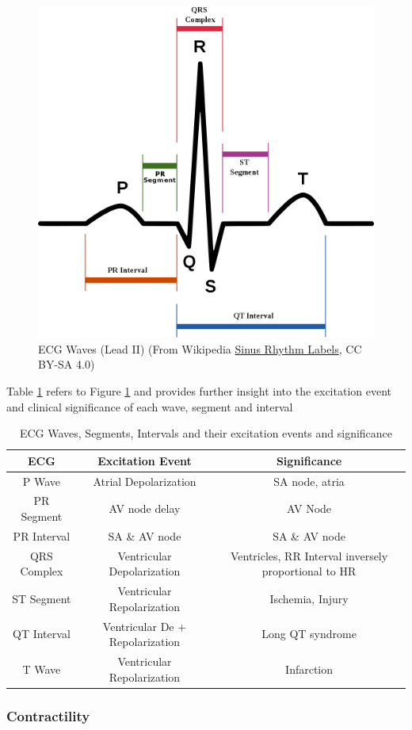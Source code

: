 \begin{figure}[!h]
    \centering
    \includegraphics[width=0.5\linewidth]{./figure/ECG.png}
    \caption{ECG Waves (Lead II) \footnotesize{(From Wikipedia  \href{https://commons.wikimedia.org/wiki/File:SinusRhythmLabels.svg}{Sinus Rhythm Labels}, CC BY-SA 4.0)}}
    \label{fig:ECG}
\end{figure}

Table \ref{ECGWaves} refers to Figure \ref{fig:ECG} and provides further insight into the excitation event and clinical significance of each wave, segment and interval

\begin{table}[h!]
\centering
\begin{tabular}{||c c c ||} 
 \hline
 ECG & Excitation Event & Significance \\ [0.5ex] 
 \hline\hline
 P Wave & Atrial Depolarization & SA node, atria \\ 
 PR Segment & AV node delay & AV Node  \\
  PR Interval & SA \& AV node & SA \& AV node  \\
 QRS Complex & Ventricular Depolarization & Ventricles, RR Interval inversely proportional to HR  \\
 ST Segment & Ventricular Repolarization & Ischemia, Injury  \\
 QT Interval & Ventricular De + Repolarization & Long QT syndrome  \\ 
 T Wave & Ventricular Repolarization & Infarction \\ [1ex] 
 \hline
\end{tabular}
\caption{ECG Waves, Segments, Intervals and their excitation events and significance}
\label{ECGWaves}
\end{table}


\subsubsection{Contractility}


